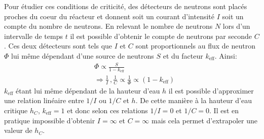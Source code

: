 Pour étudier ces conditions de criticité, des détecteurs de neutrons sont placés proches du coeur du réacteur et donnent soit un courant d'intensité $I$ soit un compte du nombre de neutrons. En relevant le nombre de neutrons $N$ lors d'un intervalle de temps $t$ il est possible d'obtenir le compte de neutrons par seconde $C$. Ces deux détecteurs sont tels que $I$ et $C$ sont proportionnels au flux de neutron $\Phi$ lui même dépendant d'une source de neutrons $S$ et du facteur $k_\mathrm{eff}$. Ainsi:
\begin{equation}
    \begin{aligned}
        & \Phi \propto \frac{S}{1 - k_\mathrm{eff}} \\
        & \Rightarrow \frac{1}{I} \, , \frac{1}{C} \propto \frac{1}{\Phi} \propto (1 - k_\mathrm{eff})
    \end{aligned}
    \label{eq:proportionalities}
\end{equation}
$k_\mathrm{eff}$ étant lui même dépendant de la hauteur d'eau $h$ il est possible d'approximer une relation linéaire entre $1/I$ ou $1/C$ et $h$. De cette manière à la hauteur d'eau critique $h_C$, $k_\mathrm{eff}=1$ et donc selon ces relations $1/I = 0$ et $1/C = 0$. Il est en pratique impossible d'obtenir $I = \infty$ et $C = \infty$ mais cela permet d'extrapoler une valeur de $h_C$.